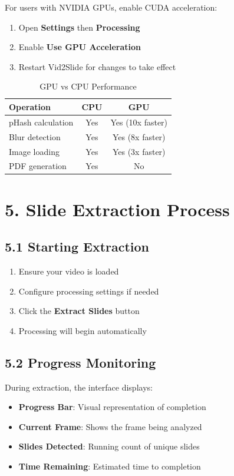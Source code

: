 \documentclass[12pt,a4paper]{article}
\newcommand{\sectionTitle}[1]{\section*{#1}}
\newcommand{\subsectionTitle}[1]{\subsection*{#1}}
\begin{document}
For users with NVIDIA GPUs, enable CUDA acceleration:
\begin{enumerate}
    \item Open \textbf{Settings} then \textbf{Processing}
    \item Enable \textbf{Use GPU Acceleration}
    \item Restart Vid2Slide for changes to take effect
\end{enumerate}

\begin{table}[H]
    \centering
    \caption{GPU vs CPU Performance}
    \begin{tabular}{lcc}
        \toprule
        \textbf{Operation} & \textbf{CPU} & \textbf{GPU} \\
        \midrule
        pHash calculation & Yes & Yes (10x faster) \\
        Blur detection & Yes & Yes (8x faster) \\
        Image loading & Yes & Yes (3x faster) \\
        PDF generation & Yes & No \\
        \bottomrule
    \end{tabular}
\end{table}

\newpage

\sectionTitle{5. Slide Extraction Process}

\subsectionTitle{5.1 Starting Extraction}

\begin{enumerate}
    \item Ensure your video is loaded
    \item Configure processing settings if needed
    \item Click the \textbf{Extract Slides} button
    \item Processing will begin automatically
\end{enumerate}

\subsectionTitle{5.2 Progress Monitoring}

During extraction, the interface displays:
\begin{itemize}
    \item \textbf{Progress Bar}: Visual representation of completion
    \item \textbf{Current Frame}: Shows the frame being analyzed
    \item \textbf{Slides Detected}: Running count of unique slides
    \item \textbf{Time Remaining}: Estimated time to completion
\end{itemize}
\end{document}
